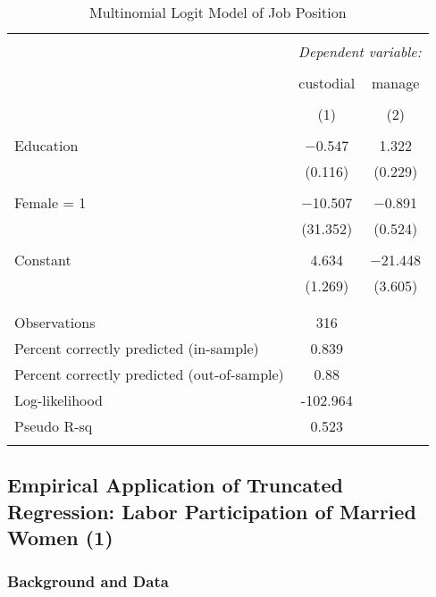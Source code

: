 \documentclass[
  12pt,
]{article}
\begin{document}
\begin{table}[t] \centering 
  \caption{Multinomial Logit Model of Job Position} 
  \label{job} 
\begin{tabular}{@{\extracolsep{5pt}}lcc} 
\\[-1.8ex]\hline 
\hline \\[-1.8ex] 
 & \multicolumn{2}{c}{\textit{Dependent variable:}} \\ 
\cline{2-3} 
\\[-1.8ex] & custodial & manage \\ 
\\[-1.8ex] & (1) & (2)\\ 
\hline \\[-1.8ex] 
 Education & $-$0.547 & 1.322 \\ 
  & (0.116) & (0.229) \\ 
  & & \\ 
 Female = 1 & $-$10.507 & $-$0.891 \\ 
  & (31.352) & (0.524) \\ 
  & & \\ 
 Constant & 4.634 & $-$21.448 \\ 
  & (1.269) & (3.605) \\ 
  & & \\ 
\hline \\[-1.8ex] 
Observations & 316 &  \\ 
Percent correctly predicted (in-sample) & 0.839 &  \\ 
Percent correctly predicted (out-of-sample) & 0.88 &  \\ 
Log-likelihood & -102.964 &  \\ 
Pseudo R-sq & 0.523 &  \\ 
\hline 
\hline \\[-1.8ex] 
\end{tabular} 
\end{table}

\hypertarget{empirical-application-of-truncated-regression-labor-participation-of-married-women-1}{%
\subsection{Empirical Application of Truncated Regression: Labor Participation of Married Women (1)}\label{empirical-application-of-truncated-regression-labor-participation-of-married-women-1}}

\hypertarget{background-and-data-3}{%
\subsubsection{Background and Data}\label{background-and-data-3}}
\end{document}
